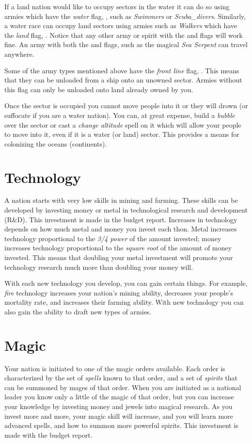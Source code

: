 If a land nation would like to occupy sectors in the water it can do
so using armies which have the {\em water} flag, , such as {\em
Swimmers} or {\em Scuba_divers}. Similarly, a water race can occupy
land sectors using armies such as {\em Walkers} which have the {\em
land} flag, .  Notice that any other army or spirit with the
 and  flags will work fine.  An army with both the 
and  flags, such as the magical {\em Sea Serpent} can travel
anywhere.

Some of the army types mentioned above have the {\em front line} flag,
. This means that they can be unloaded from a ship onto an
unowned sector.  Armies without this flag can only be unloaded onto
land already owned by you.

Once the sector is occupied you cannot move people into it or they
will drown (or suffocate if you are a water nation).  You can, at
great expense, build a {\em bubble} over the sector or cast a {\em
change altitude} spell on it which will allow your people to move into
it, even if it is a water (or land) sector.  This provides a means for
colonizing the oceans (continents).

\section{Technology}
\label{sec-technology}
A nation starts with very low skills in mining and farming. These
skills can be developed by investing money or metal in technological
research and development (R\&D).  This investment is made in the
budget report.  Increases in technology depends on how much metal and
money you invest each thon.  Metal increases technology proportional
to the {\em 3/4 power} of the amount invested; money increases
technology proportional to the {\em square root} of the amount of
money invested.  This means that doubling your metal investment will
promote your technology research much more than doubling your money
will.

With each new technology you develop, you can gain certain things.
For example, {\em fire} technology increases your nation's mining
ability, decreases your people's mortality rate, and increases their
farming ability.  With new technology you can also gain the ability to
draft new types of armies.

\section{Magic}
\label{sec-magic}
Your nation is initiated to one of the magic orders available.  Each
order is characterized by the set of {\em spells} known to that
order, and a set of {\em spirits} that can be summoned by mages of
that order.  When you are initiated as a national leader you know only
a little of the magic of that order, but you can increase your
knowledge by investing money and jewels into magical research.  As you
invest more and more, your magic skill will increase, and you will
learn more advanced spells, and how to summon more powerful spirits.
This investment is made with the budget report.

